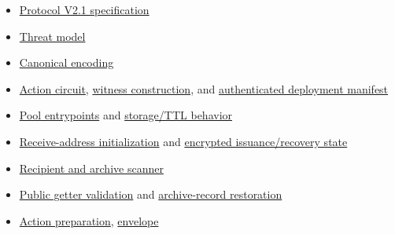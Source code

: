 \documentclass[11pt,letterpaper]{article}
\providecommand{\tightlist}{\setlength{\itemsep}{0pt}\setlength{\parskip}{0pt}}
\begin{document}
\begin{itemize}
\tightlist
\item
  \href{https://github.com/stellarchain/io.stellarkey/blob/v1.1.2/protocol/private-balance/docs/protocol-v1.md}{Protocol
  V2.1 specification}
\item
  \href{https://github.com/stellarchain/io.stellarkey/blob/v1.1.2/protocol/private-balance/docs/threat-model.md}{Threat
  model}
\item
  \href{https://github.com/stellarchain/io.stellarkey/blob/v1.1.2/protocol/private-balance/docs/encoding.md}{Canonical
  encoding}
\item
  \href{https://github.com/stellarchain/io.stellarkey/blob/v1.1.2/protocol/private-balance/circuits/circom/action.circom}{Action
  circuit},
  \href{https://github.com/stellarchain/io.stellarkey/blob/v1.1.2/src/features/private-balance/worker/action-builder.ts}{witness
  construction}, and
  \href{https://github.com/stellarchain/io.stellarkey/blob/v1.1.2/public/protocol/private-balance/v1/manifest.json}{authenticated
  deployment manifest}
\item
  \href{https://github.com/stellarchain/io.stellarkey/blob/v1.1.2/protocol/private-balance/contracts/pool/src/contract.rs}{Pool
  entrypoints} and
  \href{https://github.com/stellarchain/io.stellarkey/blob/v1.1.2/protocol/private-balance/contracts/pool/src/storage.rs}{storage/\allowbreak{}TTL
  behavior}
\item
  \href{https://github.com/stellarchain/io.stellarkey/blob/v1.1.2/src/features/private-balance/worker/client.ts}{Receive-address
  initialization} and
  \href{https://github.com/stellarchain/io.stellarkey/blob/v1.1.2/src/features/private-balance/runtime/storage.ts}{encrypted
  issuance/\allowbreak{}recovery state}
\item
  \href{https://github.com/stellarchain/io.stellarkey/blob/v1.1.2/src/features/private-balance/runtime/scanner.ts}{Recipient
  and archive scanner}
\item
  \href{https://github.com/stellarchain/io.stellarkey/blob/v1.1.2/src/features/private-balance/runtime/archive-client.ts}{Public
  getter validation} and
  \href{https://github.com/stellarchain/io.stellarkey/blob/v1.1.2/src/features/private-balance/runtime/archive-restoration.ts}{archive-record
  restoration}
\item
  \href{https://github.com/stellarchain/io.stellarkey/blob/v1.1.2/src/features/private-balance/runtime/action-transaction.ts}{Action
  preparation},
  \href{https://github.com/stellarchain/io.stellarkey/blob/v1.1.2/src/features/private-balance/runtime/transaction-review.ts}{envelope
}
\end{itemize}
\end{document}

